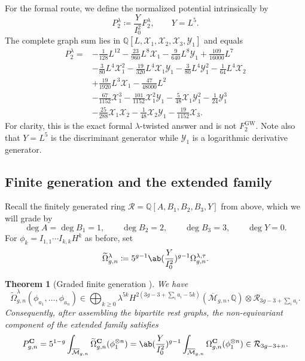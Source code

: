 \documentclass{amsart}
\newtheorem{thm}{Theorem}[section]
\theoremstyle{definition}
\theoremstyle{remark}
\theoremstyle{plain}
\theoremstyle{definition}
\theoremstyle{remark}
\newcommand{\Q}{\mathbb{Q}}
\newcommand{\Mbar}{\overline{\mathcal{M}}}
\newcommand{\mc}[1]{\mathcal{#1}}
\newcommand{\mbf}[1]{\mathbf{#1}}
\newcommand{\mr}[1]{\mathrm{#1}}
\newcommand{\wt}[1]{\widetilde{#1}}
\newcommand{\1}{\mathbf{1}}
\newcommand{\2}{\mathbf{2}}
\newcommand{\3}{\mathbf{3}}
\begin{document}
For the formal route, we define the normalized potential intrinsically by
\[ P_2^{\lambda} \coloneqq \frac{Y}{I_0^2}F_2^{\lambda}, \qquad Y = L^5. \]
The complete graph sum lies in \(\Q[L,\mc{X}_1,\mc{X}_2,\mc{X}_3,\mc{Y}_1]\) and equals
\begin{align*}
    P_2^{\lambda} ={}& -\frac{1}{128}L^{12} - \frac{23}{960}L^8\mc{X}_1 - \frac{9}{640}L^8\mc{Y}_1 + \frac{109}{16000}L^7 \\
    &- \frac{3}{80}L^4\mc{X}_1^2 - \frac{19}{320}L^4\mc{X}_1\mc{Y}_1 - \frac{3}{80}L^4\mc{Y}_1^2 - \frac{1}{64}L^4\mc{X}_2 \\
    &+ \frac{19}{1920}L^3\mc{X}_1 - \frac{47}{48000}L^2 \\
    &- \frac{67}{1152}\mc{X}_1^3 - \frac{101}{1152}\mc{X}_1^2\mc{Y}_1 - \frac{5}{48}\mc{X}_1\mc{Y}_1^2 - \frac{1}{24}\mc{Y}_1^3 \\
    &- \frac{25}{288}\mc{X}_1\mc{X}_2 - \frac{1}{48}\mc{X}_2\mc{Y}_1 - \frac{19}{1152}\mc{X}_3.
\end{align*}
For clarity, this is the exact formal \(\lambda\)-twisted answer and is not \(F_2^{\mr{GW}}\). Note also that \(Y = L^5\) is the discriminant generator while \(\mc{Y}_1\) is a logarithmic derivative generator.

\subsection{Finite generation and the extended family}%
\label{sub:Finite generation and the extended family}

Recall the finitely generated ring \(\mc{R} = \Q[A,B_1,B_2,B_3,Y]\) from above, which we will grade by
\[ \deg A = \deg B_1 = 1, \qquad \deg B_2 = 2, \qquad \deg B_3 = 3, \qquad \deg Y = 0. \]
For \(\phi_k = I_{1,1}\cdots I_{k,k}H^k\) as before, set
\[ \wt{\Omega}^{\lambda}_{g,n} \coloneqq 5^{g-1}\ab(\frac{Y}{I_0^2})^{g-1}\Omega^{\lambda,\tau}_{g,n}. \]

\begin{thm}[Graded finite generation {\cite{GJRstructure}}]%
\label{thm:graded finite generation}
    We have
    \[ \wt{\Omega}^{\lambda}_{g,n}(\phi_{a_1}, \ldots, \phi_{a_n}) \in \bigoplus_{k \geq 0}\lambda^{5k}H^{2(3g-3+\sum_i a_i - 5k)}(\Mbar_{g,n},\Q)\otimes \mc{R}_{3g-3+\sum_i a_i}. \]
    Consequently, after assembling the bipartite rest graphs, the non-equivariant component of the extended family satisfies
    \[ P^{\mbf{C}}_{g,n} = 5^{1-g}\int_{\Mbar_{g,n}}\wt{\Omega}^{\mbf{C}}_{g,n}(\phi_1^{\otimes n}) = \ab( \frac{Y}{I_0^2})^{g-1}\int_{\Mbar_{g,n}}\Omega^{\mbf{C}}_{g,n}(\phi_1^{\otimes n}) \in \mc{R}_{3g-3+n}. \]
\end{thm}
\end{document}
